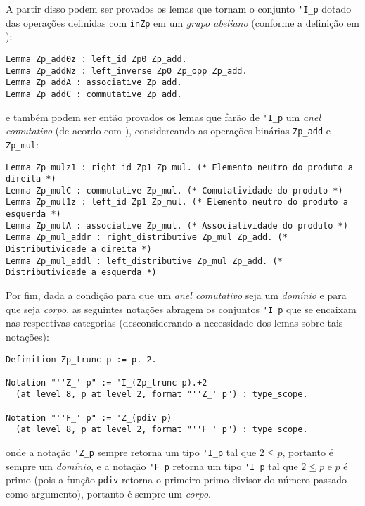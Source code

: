 A partir disso podem ser provados os lemas que tornam o conjunto \lstinline[language = coq]{'I_p} dotado das operações definidas com \lstinline[language = coq]{inZp} em um \textit{grupo abeliano} (conforme a definição em \cite[p.~41-46]{book:2399854}):
    \begin{lstlisting}[language=coq,frame=single,tabsize=1]
Lemma Zp_add0z : left_id Zp0 Zp_add.
Lemma Zp_addNz : left_inverse Zp0 Zp_opp Zp_add.
Lemma Zp_addA : associative Zp_add.
Lemma Zp_addC : commutative Zp_add.
    \end{lstlisting}
e também podem ser então provados os lemas que farão de \lstinline[language = coq]{'I_p} um \textit{anel comutativo} (de acordo com \cite[p.~46-47]{book:2399854}), considereando as operações binárias \lstinline[language = coq]{Zp_add} e \lstinline[language = coq]{Zp_mul}:
    \begin{lstlisting}[language=coq,frame=single,tabsize=1]
Lemma Zp_mulz1 : right_id Zp1 Zp_mul. (* Elemento neutro do produto a direita *)
Lemma Zp_mulC : commutative Zp_mul. (* Comutatividade do produto *)
Lemma Zp_mul1z : left_id Zp1 Zp_mul. (* Elemento neutro do produto a esquerda *)
Lemma Zp_mulA : associative Zp_mul. (* Associatividade do produto *)
Lemma Zp_mul_addr : right_distributive Zp_mul Zp_add. (* Distributividade a direita *)
Lemma Zp_mul_addl : left_distributive Zp_mul Zp_add. (* Distributividade a esquerda *)
    \end{lstlisting}
Por fim, dada a condição para que um \textit{anel comutativo} seja um \textit{domínio} e para que seja \textit{corpo}, as seguintes notações abragem os conjuntos \lstinline[language=coq]|'I_p| que se encaixam nas respectivas categorias (desconsiderando a necessidade dos lemas sobre tais notações):
    \begin{lstlisting}[language=coq,frame=single,tabsize=1]
Definition Zp_trunc p := p.-2.

Notation "''Z_' p" := 'I_(Zp_trunc p).+2
  (at level 8, p at level 2, format "''Z_' p") : type_scope.
  
Notation "''F_' p" := 'Z_(pdiv p)
  (at level 8, p at level 2, format "''F_' p") : type_scope.
    \end{lstlisting}
onde a notação \lstinline[language=coq]|'Z_p| sempre retorna um tipo \lstinline[language=coq]|'I_p| tal que $2 \leq p$, portanto é sempre um \textit{domínio}, e a notação \lstinline[language=coq]|'F_p| retorna um tipo \lstinline[language=coq]|'I_p| tal que $2 \leq p$ e $p$ é primo (pois a função \lstinline[language=coq]|pdiv| retorna o primeiro primo divisor do número passado como argumento), portanto é sempre um \textit{corpo}.

